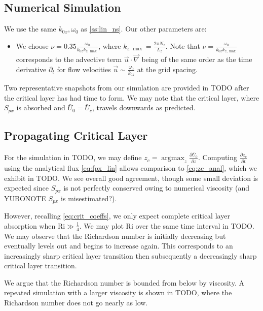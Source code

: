 \documentclass[twocolumn,
        nofootinbib, %
        usenames, %
        aps,
        prd,
        dvipsnames %
    ]{revtex4-1}%
\newcommand*{\pd}[2]{\frac{\partial#1}{\partial#2}}
\DeclareMathOperator*{\argmax}{argmax}
\begin{document}
\subsection{Numerical Simulation}\label{ss:nl_ns}

We use the same $k_{0x}, \omega_0$ as \autoref{ss:lin_ns}. Our other parameters
are:
\begin{itemize}
    \item We choose $\nu = 0.35 \frac{\omega_0}{k_{0z}k_{z, \max}}$, where
        $k_{z, \max} = \frac{2\pi N_z}{L_z}$. Note that $\nu =
        \frac{\omega_0}{k_{0z} k_{z, \max}}$ corresponds to the advective term
        $\vec{u} \cdot \vec{\nabla}$ being of the same order as the time
        derivative $\partial_t$ for flow velocities $\vec{u} \sim
        \frac{\omega_0}{k_{0z}}$ at the grid spacing.
\end{itemize}

Two representative snapshots from our simulation are provided in
TODO after the critical layer has had time to form. We may note that
the critical layer, where $S_{px}$ is absorbed and $\bar{U}_0 = \bar{U}_c$,
travels downwards as predicted.

\subsection{Propagating Critical Layer}

For the simulation in TODO, we may define $z_c = \argmax_z
\pd{\bar{U}_0}{z}$. Computing $\pd{z_c}{t}$ using the analytical flux
\autoref{eq:fpx_lin} allows comparison to \autoref{eq:zc_anal}, which we exhibit
in TODO\@. We see overall good agreement, though some small
deviation is expected since $S_{px}$ is not perfectly conserved owing to
numerical viscosity (and YUBONOTE $S_{px}$ is misestimated?).

However, recalling \autoref{eq:crit_coeffs}, we only expect complete critical
layer absorption when $\mathrm{Ri} \gg \frac{1}{4}$. We may plot $\mathrm{Ri}$
over the same time interval in TODO\@. We may observe that the
Richardson number is initially decreasing but eventually levels out and
begins to increase again. This corresponds to an increasingly sharp critical
layer transition then subsequently a decreasingly sharp critical layer
transition.

We argue that the Richardson number is bounded from below by viscosity. A
repeated simulation with a larger viscosity is shown in TODO,
where the Richardson number does not go nearly as low.
\end{document}
